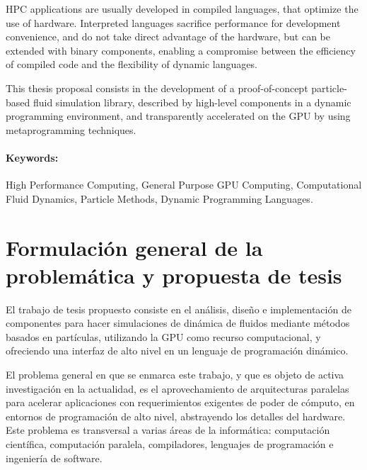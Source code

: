 \documentclass[11pt,spanish]{article}
\begin{document}
HPC applications are usually developed in compiled languages, that optimize the
use of hardware.  Interpreted languages sacrifice performance for development
convenience, and do not take direct advantage of the hardware, but can be
extended with binary components, enabling a compromise between the efficiency of
compiled code and the flexibility of dynamic languages.

This thesis proposal consists in the development of a proof-of-concept
particle-based fluid simulation library, described by high-level components in a
dynamic programming environment, and transparently accelerated on the GPU by
using metaprogramming techniques.

\paragraph{Keywords:}
High Performance Computing,
General Purpose GPU Computing,
Computational Fluid Dynamics,
Particle Methods,
Dynamic Programming Languages.

\newpage
\section{Formulación general de la problemática y propuesta de tesis}

%

El trabajo de tesis propuesto consiste en el análisis, diseño e implementación
de componentes para hacer simulaciones de dinámica de fluidos mediante métodos
basados en partículas, utilizando la GPU como recurso computacional, y
ofreciendo una interfaz de alto nivel en un lenguaje de programación dinámico.

El problema general en que se enmarca este trabajo, y que es objeto de activa
investigación en la actualidad, es el aprovechamiento de arquitecturas paralelas
para acelerar aplicaciones con requerimientos exigentes de poder de cómputo, en
entornos de programación de alto nivel, abstrayendo los detalles del hardware.
Este problema es transversal a varias áreas de la informática: computación
científica, computación paralela, compiladores, lenguajes de programación e
ingeniería de software.
\end{document}
